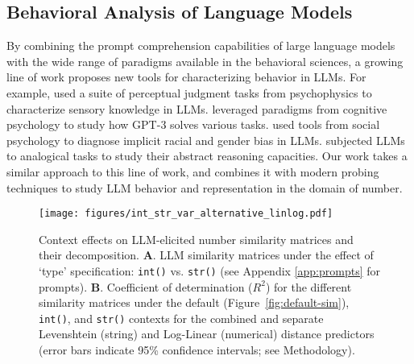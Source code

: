 



\subsection{Behavioral Analysis of Language Models}
By combining the prompt comprehension capabilities of large language models with the wide range of paradigms available in the behavioral sciences, a growing line of work proposes new tools for characterizing behavior in LLMs. For example, \citet{marjieh2024large} used a suite of perceptual judgment tasks from psychophysics to characterize sensory knowledge in LLMs. \citet{binz2023using} leveraged paradigms from cognitive psychology to study how GPT-3 solves various tasks. \citet{bai2024measuring} used tools from social psychology to diagnose implicit racial and gender bias in LLMs. \citet{webb2023emergent} subjected LLMs to analogical tasks to study their abstract reasoning capacities. Our work takes a similar approach to this line of work, and combines it with modern probing techniques to study LLM behavior and representation in the domain of number.

\begin{figure*}[ht]
    \centering
    \texttt{[image: figures/int\_str\_var\_alternative\_linlog.pdf]}
    \caption{Context effects on LLM-elicited number similarity matrices and their decomposition. \textbf{A}. LLM similarity matrices under the effect of `type' specification: \texttt{int()} vs. \texttt{str()} (see Appendix \ref{app:prompts} for prompts). \textbf{B}. Coefficient of determination ($R^2$) for the different similarity matrices under the default (Figure~\ref{fig:default-sim}), \texttt{int()}, and \texttt{str()} contexts for the combined and separate Levenshtein (string) and Log-Linear (numerical) distance predictors (error bars indicate 95\% confidence intervals; see Methodology).}
    \label{fig:int-str-sim}
\end{figure*}